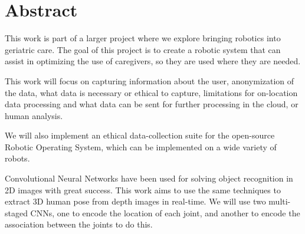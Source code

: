 \chapter*{Abstract}


This work is part of a larger project where we explore bringing robotics into geriatric care. The goal of this project is to create a robotic system that can assist in optimizing the use of caregivers, so they are used where they are needed.

This work will focus on capturing information about the user, anonymization of the data, what data is necessary or ethical to capture, limitations for on-location data processing and what data can be sent for further processing in the cloud, or human analysis.

We will also implement an ethical data-collection suite for the open-source Robotic Operating System, which can be implemented on a wide variety of robots.

Convolutional Neural Networks have been used for solving object recognition in 2D images with great success. This work aims to use the same techniques to extract 3D human pose from depth images in real-time. We will use two multi-staged CNNs, one to encode the location of each joint, and another to encode the association between the joints to do this.





